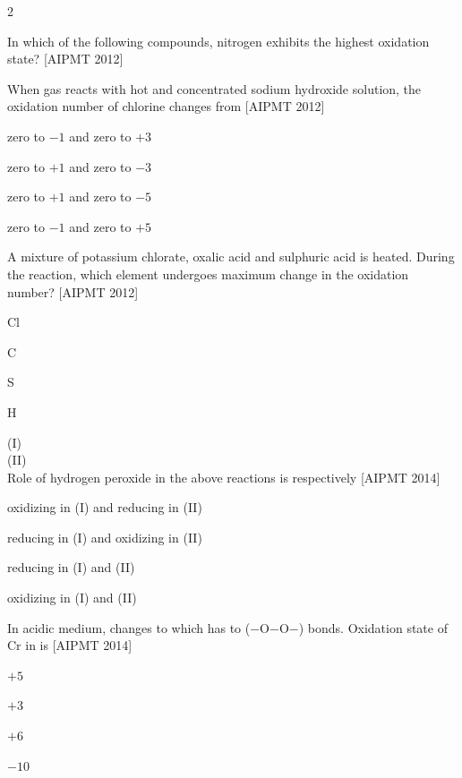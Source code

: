 \documentclass[10pt,a4paper]{article}
\begin{document}
\begin{multicols}{2}
\begin{questions}[start=1]
\item In which of the following compounds, nitrogen exhibits the highest oxidation state? \hfill [AIPMT 2012]
\begin{options}
  \item {}
  \item {}
  \item {}
  \item {}
\end{options}

\item When  gas reacts with hot and concentrated sodium hydroxide solution, the oxidation number of chlorine changes from \hfill [AIPMT 2012]
\begin{options}
  \item zero to $-1$ and zero to $+3$
  \item zero to $+1$ and zero to $-3$
  \item zero to $+1$ and zero to $-5$
  \item zero to $-1$ and zero to $+5$
\end{options}

\item A mixture of potassium chlorate, oxalic acid and sulphuric acid is heated. During the reaction, which element undergoes maximum change in the oxidation number? \hfill [AIPMT 2012]
\begin{options}
  \item Cl
  \item C
  \item S
  \item H
\end{options}

\item (I) \\
(II) \\
Role of hydrogen peroxide in the above reactions is respectively \hfill [AIPMT 2014]
\begin{options}
  \item oxidizing in (I) and reducing in (II)
  \item reducing in (I) and oxidizing in (II)
  \item reducing in (I) and (II)
  \item oxidizing in (I) and (II)
\end{options}

\item In acidic medium,  changes  to  which has to ($-$O$-$O$-$) bonds. Oxidation state of Cr in  is \hfill [AIPMT 2014]
\begin{options}
  \item $+5$
  \item $+3$
  \item $+6$
  \item $-10$
\end{options}


\end{questions}
\end{multicols}
\end{document}
